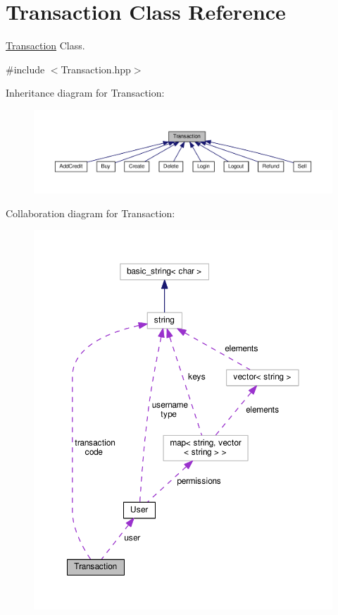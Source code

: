 \hypertarget{class_transaction}{\section{Transaction Class Reference}
\label{class_transaction}
}


\hyperlink{class_transaction}{Transaction} Class.  




{\ttfamily \#include $<$Transaction.\-hpp$>$}



Inheritance diagram for Transaction\-:\nopagebreak
\begin{figure}[H]
\begin{center}
\leavevmode
\includegraphics[width=350pt]{class_transaction__inherit__graph}
\end{center}
\end{figure}


Collaboration diagram for Transaction\-:\nopagebreak
\begin{figure}[H]
\begin{center}
\leavevmode
\includegraphics[width=350pt]{class_transaction__coll__graph}
\end{center}
\end{figure}
